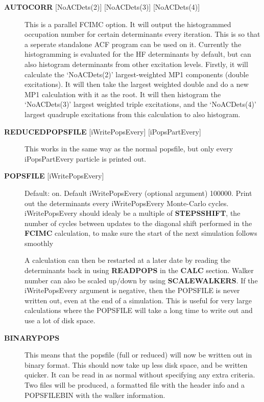 \documentclass[openany,a4paper,10pt]{manual}
\begin{document}
\begin{description}
\item[\textbf{AUTOCORR} {[}NoACDets(2){]} {[}NoACDets(3){]} {[}NoACDets(4){]}]
This is a parallel FCIMC option. It will output the histogrammed occupation number for certain
determinants every iteration. This is so that a seperate standalone ACF program can be used on it.
Currently the histogramming is evaluated for the HF determinants by default, but can also
histogram determinants from other excitation levels. Firstly, it will calculate the `NoACDets(2)'
largest-weighted MP1 components (double excitations). It will then take the largest weighted double
and do a new MP1 calculation with it as the root. It will then histogram the `NoACDets(3)' largest
weighted triple excitations, and the `NoACDets(4)' largest quadruple excitations from this calculation
to also histogram.

\item[\textbf{REDUCEDPOPSFILE} {[}iWritePopsEvery{]} {[}iPopsPartEvery{]}]
This works in the same way as the normal popsfile, but only every iPopsPartEvery particle is printed out.

\item[\textbf{POPSFILE} {[}iWritePopsEvery{]}]
Default: on.  Default iWritePopsEvery (optional argument) 100000.
Print out the determinants every iWritePopsEvery Monte-Carlo cycles.
iWritePopsEvery should idealy be a multiple of \textbf{STEPSSHIFT}, the number of
cycles between updates to the diagonal shift performed in the
\textbf{FCIMC} calculation, to make sure the start of the next simulation follows
smoothly

A calculation can then be restarted at a later date by reading the
determinants back in using \textbf{READPOPS} in the \textbf{CALC} section.
Walker number can also be scaled up/down by using \textbf{SCALEWALKERS}.
If the iWritePopsEvery argument is negative, then the POPSFILE is never
written out, even at the end of a simulation. This is useful for very large
calculations where the POPSFILE will take a long time to write out and use
a lot of disk space.

\item[\textbf{BINARYPOPS}]
This means that the popsfile (full or reduced) will now be written out in binary format.
This should now take up less disk space, and be written quicker. It can be read in as
normal without specifying any extra criteria. Two files will be produced, a formatted
file with the header info and a POPSFILEBIN with the walker information.


\end{description}
\end{document}
